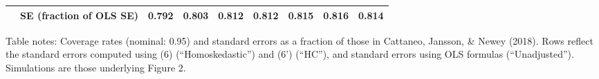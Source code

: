 \begin{table}
\begin{threeparttable}
\begin{tabular}[t]{llrrrrrrr}
\hspace{1em} & SE (fraction of OLS SE) & 0.792 & 0.803 & 0.812 & 0.812 & 0.815 & 0.816 & 0.814\\
\bottomrule
\end{tabular}
\begin{tablenotes}
\small
\item [] Table notes: Coverage rates (nominal: 0.95) and standard errors as a fraction of those in Cattaneo, Jansson, \& Newey (2018). Rows reflect the standard errors computed using (6) (``Homoskedastic'') and (6') (``HC''), and standard errors using OLS formulas (``Unadjusted''). Simulations are those underlying Figure 2.
\end{tablenotes}
\end{threeparttable}
\end{table}
